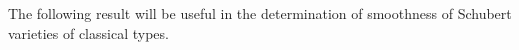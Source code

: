 \documentclass[11pt, reqno]{amsart}
\theoremstyle{definition}
\numberwithin{equation}{section}
\begin{document}






     


The following result will be useful in the determination of smoothness of Schubert varieties of classical types.
\end{document}
